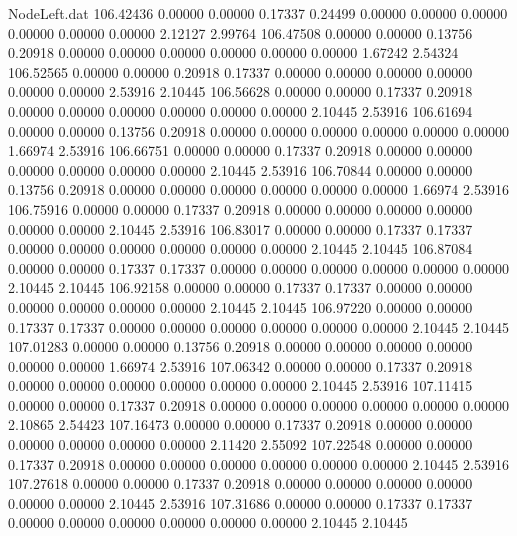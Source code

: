 \begin{filecontents}{NodeLeft.dat}
 106.42436    0.00000    0.00000     0.17337    0.24499    0.00000    0.00000    0.00000    0.00000    0.00000    0.00000    2.12127    2.99764
 106.47508    0.00000    0.00000     0.13756    0.20918    0.00000    0.00000    0.00000    0.00000    0.00000    0.00000    1.67242    2.54324
 106.52565    0.00000    0.00000     0.20918    0.17337    0.00000    0.00000    0.00000    0.00000    0.00000    0.00000    2.53916    2.10445
 106.56628    0.00000    0.00000     0.17337    0.20918    0.00000    0.00000    0.00000    0.00000    0.00000    0.00000    2.10445    2.53916
 106.61694    0.00000    0.00000     0.13756    0.20918    0.00000    0.00000    0.00000    0.00000    0.00000    0.00000    1.66974    2.53916
 106.66751    0.00000    0.00000     0.17337    0.20918    0.00000    0.00000    0.00000    0.00000    0.00000    0.00000    2.10445    2.53916
 106.70844    0.00000    0.00000     0.13756    0.20918    0.00000    0.00000    0.00000    0.00000    0.00000    0.00000    1.66974    2.53916
 106.75916    0.00000    0.00000     0.17337    0.20918    0.00000    0.00000    0.00000    0.00000    0.00000    0.00000    2.10445    2.53916
 106.83017    0.00000    0.00000     0.17337    0.17337    0.00000    0.00000    0.00000    0.00000    0.00000    0.00000    2.10445    2.10445
 106.87084    0.00000    0.00000     0.17337    0.17337    0.00000    0.00000    0.00000    0.00000    0.00000    0.00000    2.10445    2.10445
 106.92158    0.00000    0.00000     0.17337    0.17337    0.00000    0.00000    0.00000    0.00000    0.00000    0.00000    2.10445    2.10445
 106.97220    0.00000    0.00000     0.17337    0.17337    0.00000    0.00000    0.00000    0.00000    0.00000    0.00000    2.10445    2.10445
 107.01283    0.00000    0.00000     0.13756    0.20918    0.00000    0.00000    0.00000    0.00000    0.00000    0.00000    1.66974    2.53916
 107.06342    0.00000    0.00000     0.17337    0.20918    0.00000    0.00000    0.00000    0.00000    0.00000    0.00000    2.10445    2.53916
 107.11415    0.00000    0.00000     0.17337    0.20918    0.00000    0.00000    0.00000    0.00000    0.00000    0.00000    2.10865    2.54423
 107.16473    0.00000    0.00000     0.17337    0.20918    0.00000    0.00000    0.00000    0.00000    0.00000    0.00000    2.11420    2.55092
 107.22548    0.00000    0.00000     0.17337    0.20918    0.00000    0.00000    0.00000    0.00000    0.00000    0.00000    2.10445    2.53916
 107.27618    0.00000    0.00000     0.17337    0.20918    0.00000    0.00000    0.00000    0.00000    0.00000    0.00000    2.10445    2.53916
 107.31686    0.00000    0.00000     0.17337    0.17337    0.00000    0.00000    0.00000    0.00000    0.00000    0.00000    2.10445    2.10445

\end{filecontents}
